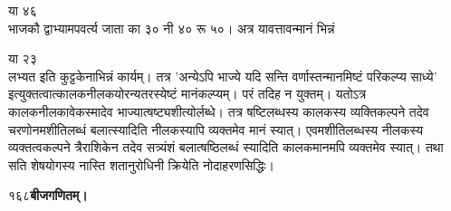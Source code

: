 \documentclass[11pt, openany]{book}
\begin{document}
\begin{sloppypar}
\hspace{0.7in}या ४६\\

\hangindent=0.2in भाजकौ द्वाभ्यामपवर्त्य जाता का ३० नी ४० रू ५०। अत्र यावत्तावन्मानं भिन्नं

\hspace{2.75in}या २३\\

\hangindent=0.2in लभ्यत इति कुट्टकेनाभिन्नं कार्यम्। तत्र 'अन्येऽपि भाज्ये यदि सन्ति वर्णास्तन्मानमिष्टं परिकल्प्य साध्ये' इत्युक्तत्वात्कालकनीलकयोरन्यतरस्येष्टं मानंकल्प्यम्। परं तदिह न युक्तम्। यतोऽत्र कालकनीलकावेकस्मादेव भाज्यात्षष्ट्यशीत्योर्लब्धे। तत्र षष्टिलब्धस्य कालकस्य व्यक्तिकल्पने तदेव चरणोनमशीतिलब्धं बलात्स्यादिति नीलकस्यापि व्यक्तमेव मानं स्यात्। एवमशीतिलब्धस्य नीलकस्य व्यक्तत्वकल्पने त्रैराशिकेन तदेव सत्र्यंशं बलात्षष्ठिलब्धं स्यादिति कालकमानमपि व्यक्तमेव स्यात्। तथा सति शेषयोगस्य नास्ति शतानुरोधिनी क्रियेति नोदाहरणसिद्धिः।
\end{sloppypar}
\thispagestyle{empty}
\newpage

\onehalfspacing
१६८\hspace{2in}\textbf{बीजगणितम्।} 

\vspace{5mm}
\end{document}
